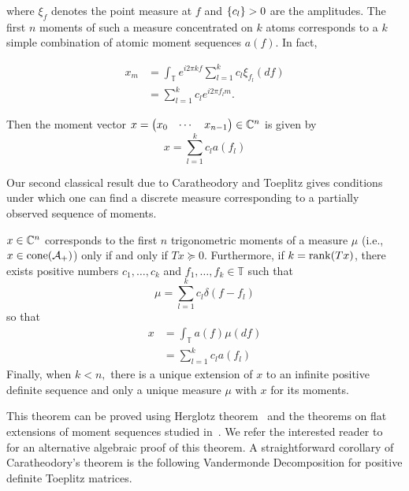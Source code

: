 where $\xi_f$ denotes the point measure at $f$ and $\left\{ c_l \right\} > 0$ are the
amplitudes. The first $n$ moments of such a measure concentrated on $k$ atoms
corresponds to a $k$ simple combination of atomic moment sequences $a(f).$ In
fact,

\begin{align*}
	x_m &= \int_\mathbb{T} e^{i 2 \pi k f} \sum_{l=1}^k c_l \xi_{f_l}(d f)\\
	&= \sum_{l=1}^k c_l e^{i 2 \pi f_l m}.
\end{align*}

Then the moment vector
$x = \begin{pmatrix}x_0 & \cdots & x_{n-1}\end{pmatrix} \in \mathbb{C}^n$ is given by
\[
x = \sum_{l=1}^k c_l a(f_l)
\]

Our second classical result due to Caratheodory and Toeplitz gives conditions
under which one can find a discrete measure corresponding to a partially
observed sequence of moments.

\begin{theorem}
\label{thm:caratheodory-toeplitz}
	$x \in \mathbb{C}^n$ corresponds to the first $n$ trigonometric moments of a measure $\mu$ (i.e., $x \in \operatorname{cone}(\mathcal{A}_+)$) only if and only if $T x \succeq 0.$ Furthermore, if $k = \operatorname{rank}(T x)$, there exists positive numbers $c_1, \ldots, c_k$ and $f_1, \ldots, f_k \in \mathbb{T}$ such  that
\[
	\mu = \sum_{l=1}^k c_l \delta(f - f_l)
\]
so that
\begin{align*}
	x &= \int_{\mathbb{T}} a(f) \mu(df)\\
	& = \sum_{l=1}^k c_l a(f_l)
\end{align*}
Finally, when $k < n,$ there is a unique extension of $x$ to an infinite positive definite sequence and only a unique measure $\mu$ with $x$ for its moments.
\end{theorem}

This theorem can be proved using Herglotz theorem~\cite{herglotz} and the
theorems on flat extensions of moment sequences studied in~\cite{Curto97}. We
refer the interested reader to~\cite{grenander01} for an alternative algebraic
proof of this theorem. A straightforward corollary of Caratheodory's theorem is the following Vandermonde Decomposition for positive definite Toeplitz matrices.

